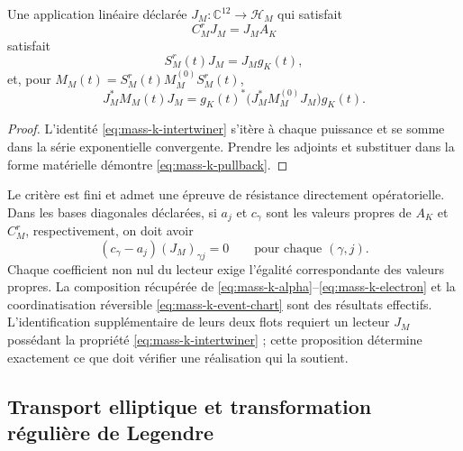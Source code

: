 \begin{proposition}
Une application linéaire déclarée \(J_M:\mathbb C^{12}\to\mathscr H_M\) qui satisfait
\begin{equation}
 C_M^rJ_M=J_MA_K
 \label{eq:mass-k-intertwiner}
\end{equation}
satisfait
\[
 S_M^r(t)J_M=J_Mg_K(t),
\]
et, pour \(M_M(t)=S_M^r(t)M_M^{(0)}S_M^r(t)\),
\begin{equation}
 J_M^*M_M(t)J_M
 =g_K(t)^*\bigl(J_M^*M_M^{(0)}J_M\bigr)g_K(t).
 \label{eq:mass-k-pullback}
\end{equation}
\end{proposition}
\begin{proof}
L’identité \eqref{eq:mass-k-intertwiner} s’itère à chaque puissance
et se somme dans la série exponentielle convergente. Prendre les adjoints et
substituer dans la forme matérielle démontre
\eqref{eq:mass-k-pullback}.
\end{proof}

Le critère est fini et admet une épreuve de résistance directement opératorielle. Dans les bases diagonales déclarées, si \(a_j\) et \(c_\gamma\) sont les valeurs propres de \(A_K\) et \(C_M^r\), respectivement, on doit avoir
\[
 (c_\gamma-a_j)(J_M)_{\gamma j}=0
 \qquad\text{pour chaque }(\gamma,j).
\]
Chaque coefficient non nul du lecteur exige l'égalité correspondante des valeurs propres. La composition récupérée de \eqref{eq:mass-k-alpha}--\eqref{eq:mass-k-electron} et la coordinatisation réversible \eqref{eq:mass-k-event-chart} sont des résultats effectifs. L'identification supplémentaire de leurs deux flots requiert un lecteur \(J_M\) possédant la propriété \eqref{eq:mass-k-intertwiner} ; cette proposition détermine exactement ce que doit vérifier une réalisation qui la soutient.

\subsection{Transport elliptique et transformation régulière de Legendre}

